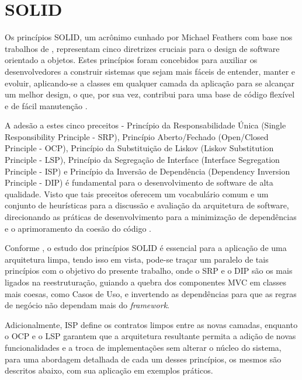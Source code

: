 \section{SOLID}

    \par Os princípios SOLID, um acrônimo cunhado por Michael Feathers com base nos trabalhos de \cite{livro:martin:cleanarch}, representam cinco diretrizes cruciais para o design de software orientado a objetos. Estes princípios foram concebidos para auxiliar os desenvolvedores a construir sistemas que sejam mais fáceis de entender, manter e evoluir, aplicando-se a classes em qualquer camada da aplicação para se alcançar um melhor design, o que, por sua vez, contribui para uma base de código flexível e de fácil manutenção \cite{livro:joshi:2016}.

    \par A adesão a estes cinco preceitos - Princípio da Responsabilidade Única (Single Responsibility Principle - SRP), Princípio Aberto/Fechado (Open/Closed Principle - OCP), Princípio da Substituição de Liskov (Liskov Substitution Principle - LSP), Princípio da Segregação de Interface (Interface Segregation Principle - ISP) e Princípio da Inversão de Dependência (Dependency Inversion Principle - DIP) é fundamental para o desenvolvimento de software de alta qualidade. Visto que tais preceitos oferecem um vocabulário comum e um conjunto de heurísticas para a discussão e avaliação da arquitetura de software, direcionando as práticas de desenvolvimento para a minimização de dependências e o aprimoramento da coesão do código \cite{artigo:ramachandrappa:2024}.

    \par Conforme \cite{livro:martin:cleanarch}, o estudo dos princípios SOLID é essencial para a aplicação de uma arquitetura limpa, tendo isso em vista, pode-se traçar um paralelo de tais princípios com o objetivo do presente trabalho, onde o SRP e o DIP são os mais ligados na reestruturação, guiando a quebra dos componentes MVC em classes mais coesas, como Casos de Uso, e invertendo as dependências para que as regras de negócio não dependam mais do \textit{framework}. 
    
    \par Adicionalmente, ISP define os contratos limpos entre as novas camadas, enquanto o OCP e o LSP garantem que a arquitetura resultante permita a adição de novas funcionalidades e a troca de implementações sem alterar o núcleo do sistema, para uma abordagem detalhada de cada um desses princípios, os mesmos são descritos abaixo, com sua aplicação em exemplos práticos.